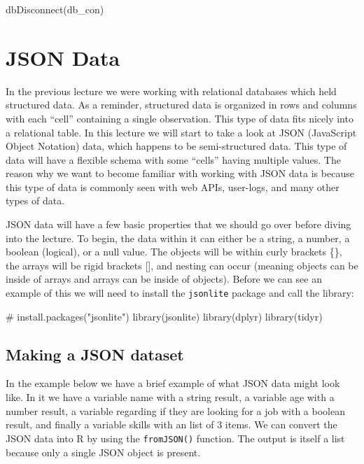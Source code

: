 \documentclass[
  letterpaper,
  DIV=11,
  numbers=noendperiod]{scrreprt}
\newenvironment{Shaded}{\begin{snugshade}}{\end{snugshade}}
\newcommand{\CommentTok}[1]{\textcolor[rgb]{0.37,0.37,0.37}{#1}}
\newcommand{\FunctionTok}[1]{\textcolor[rgb]{0.28,0.35,0.67}{#1}}
\newcommand{\NormalTok}[1]{\textcolor[rgb]{0.00,0.23,0.31}{#1}}
\begin{document}
\begin{Shaded}
\begin{Highlighting}[]
\FunctionTok{dbDisconnect}\NormalTok{(db\_con)}
\end{Highlighting}
\end{Shaded}


\chapter{JSON Data}\label{json-data}

In the previous lecture we were working with relational databases which
held structured data. As a reminder, structured data is organized in
rows and columns with each ``cell'' containing a single observation.
This type of data fits nicely into a relational table. In this lecture
we will start to take a look at JSON (JavaScript Object Notation) data,
which happens to be semi-structured data. This type of data will have a
flexible schema with some ``cells'' having multiple values. The reason
why we want to become familiar with working with JSON data is because
this type of data is commonly seen with web APIs, user-logs, and many
other types of data.

JSON data will have a few basic properties that we should go over before
diving into the lecture. To begin, the data within it can either be a
string, a number, a boolean (logical), or a null value. The objects will
be within curly brackets \{\}, the arrays will be rigid brackets {[}{]},
and nesting can occur (meaning objects can be inside of arrays and
arrays can be inside of objects). Before we can see an example of this
we will need to install the \texttt{jsonlite} package and call the
library:

\begin{Shaded}
\begin{Highlighting}[]
\CommentTok{\# install.packages("jsonlite") }
\FunctionTok{library}\NormalTok{(jsonlite)}
\FunctionTok{library}\NormalTok{(dplyr)}
\FunctionTok{library}\NormalTok{(tidyr)}
\end{Highlighting}
\end{Shaded}

\section{Making a JSON dataset}\label{making-a-json-dataset}

In the example below we have a brief example of what JSON data might
look like. In it we have a variable name with a string result, a
variable age with a number result, a variable regarding if they are
looking for a job with a boolean result, and finally a variable skills
with an list of 3 items. We can convert the JSON data into R by using
the \texttt{fromJSON()} function. The output is itself a list because
only a single JSON object is present.
\end{document}
